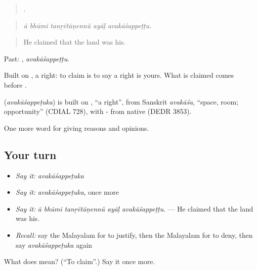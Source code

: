 \begin{quote}
    .
\end{quote}

\begin{quote}
\emph{ā bhūmi tanṟētāṇennŭ ayāḷ avakāśappeṭṭu.}
\end{quote}

\begin{quote}
He claimed that the land was his.
\end{quote}

Past: , \emph{avakāśappeṭṭu}.

Built on , a right: to claim is to say a right is yours. What is claimed comes before .

\begin{cousinweb}
\textbf{} (\emph{avakāśappeṭuka}) is built on , \textquotedblleft{}a right\textquotedblright{}, from Sanskrit \emph{avakāśa}, \textquotedblleft{}space, room; opportunity\textquotedblright{} (CDIAL 728), with - from native  (DEDR 3853).
\end{cousinweb}

\begin{grammarlens}[title={What you've built}]
One more word for giving reasons and opinions.
\end{grammarlens}

\subsection*{Your turn}
\begin{itemize}
\raggedright
  \item \emph{Say it:} \emph{avakāśappeṭuka}
  \item \emph{Say it:} \emph{avakāśappeṭuka}, once more
  \item \emph{Say it:} \emph{ā bhūmi tanṟētāṇennŭ ayāḷ avakāśappeṭṭu.} — He claimed that the land was his.
  \item \emph{Recall:} say the Malayalam for to justify, then the Malayalam for to deny, then say \emph{avakāśappeṭuka} again
\end{itemize}

\begin{tcolorbox}[breakable,colback=teal!4,colframe=teal!35!black,title={Before you move on}]
What does  mean? (\textquotedblleft{}To claim\textquotedblright{}.) Say it once more.
\end{tcolorbox}

